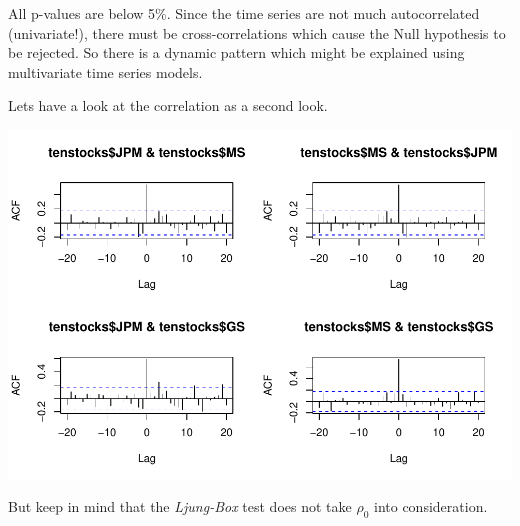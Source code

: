 \documentclass[12pt,a4paper]{article}
\newenvironment{Shaded}{\begin{snugshade}}{\end{snugshade}}
\newcommand{\DataTypeTok}[1]{\textcolor[rgb]{0.13,0.29,0.53}{#1}}
\newcommand{\DecValTok}[1]{\textcolor[rgb]{0.00,0.00,0.81}{#1}}
\newcommand{\KeywordTok}[1]{\textcolor[rgb]{0.13,0.29,0.53}{\textbf{#1}}}
\newcommand{\NormalTok}[1]{#1}
\newcommand{\OperatorTok}[1]{\textcolor[rgb]{0.81,0.36,0.00}{\textbf{#1}}}
\begin{document}
All p-values are below 5\%. Since the time series are not much
autocorrelated (univariate!), there must be cross-correlations which
cause the Null hypothesis to be rejected. So there is a dynamic pattern
which might be explained using multivariate time series models.

Lets have a look at the correlation as a second look.

\begin{Shaded}
\end{Shaded}

\includegraphics{exercise_1_files/figure-latex/unnamed-chunk-8-1.pdf}

But keep in mind that the \emph{Ljung-Box} test does not take \(\rho_0\)
into consideration.
\end{document}
